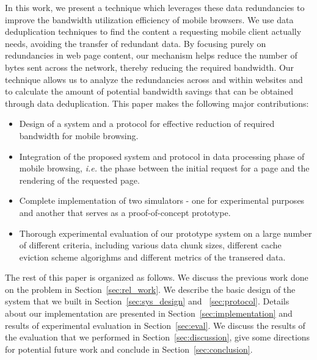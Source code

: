 In this work, we present a technique which leverages these data redundancies to improve the bandwidth utilization efficiency of mobile browsers. We use data deduplication 
techniques to find the content a requesting mobile client actually needs, avoiding the transfer of redundant data. By focusing purely on redundancies in web 
page content, our mechanism helps reduce the number of bytes sent across the network, thereby reducing the required bandwidth. Our technique allows us to analyze 
the redundancies across and within websites and to calculate the amount of potential bandwidth savings that can be obtained through data deduplication. This paper 
makes the following major contributions:
\begin{itemize}
\item Design of a system and a protocol for effective reduction of required bandwidth for mobile browsing.
\item Integration of the proposed system and protocol in data processing phase of mobile browsing, \textit{i.e.} the phase between the initial request for a page and
the rendering of the requested page.
\item Complete implementation of two simulators - one for experimental purposes and another that serves as a proof-of-concept prototype.
\item Thorough experimental evaluation of our prototype system on a large number of different criteria, including various data chunk sizes, different cache eviction scheme
algorighms and different metrics of the transered data.
\end{itemize}

The rest of this paper is organized as follows. We discuss the previous work done on the problem in Section~\ref{sec:rel_work}. We describe the basic design of the 
system that we built in Section~\ref{sec:sys_design} and ~\ref{sec:protocol}. Details about our implementation are presented in Section~\ref{sec:implementation} 
and results of experimental evaluation in Section~\ref{sec:eval}. We discuss the results of the evaluation that we performed in Section~\ref{sec:discussion}, give 
some directions for potential future work and conclude in Section~\ref{sec:conclusion}.
